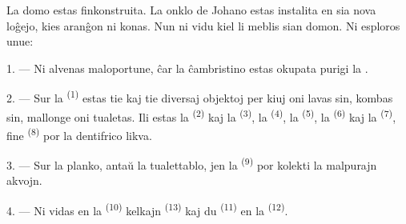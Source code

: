 %
%

\VUsaut{6.0mm}
\VUsaut{1.4mm}
\VUsaut{0.4mm}
\VUsaut{2.2mm}

La domo estas finkonstruita. La onklo de Johano estas instalita en sia nova
loĝejo, kies aranĝon ni konas. Nun ni vidu kiel li meblis sian domon. Ni
esploros unue:

\VUsaut{3.0mm}

1. --- Ni alvenas maloportune, ĉar la ĉambristino estas okupata purigi la
.

2. --- Sur la  \textsuperscript{(1)} estas tie kaj tie
diversaj objektoj per kiuj oni lavas sin, kombas sin, mallonge oni tualetas.
Ili estas la  \textsuperscript{(2)} kaj la 
\textsuperscript{(3)}, la  \textsuperscript{(4)}, la
 \textsuperscript{(5)}, la  \textsuperscript{(6)}
kaj la  \textsuperscript{(7)}, fine 
\textsuperscript{(8)} por la dentifrico likva.

3. --- Sur la planko, antaŭ la tualettablo, jen la 
\textsuperscript{(9)} por kolekti la malpurajn akvojn.

4. --- Ni vidas en la  \textsuperscript{(10)} kelkajn
 \textsuperscript{(13)} kaj du 
\textsuperscript{(11)} en la  \textsuperscript{(12)}.

